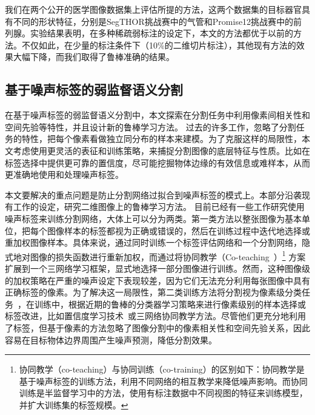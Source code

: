 我们在两个公开的医学图像数据集上评估所提的方法，这两个数据集的目标器官具有不同的形状特征，分别是SegTHOR挑战赛\citep{trullo2019multiorgan}中的气管和Promise12挑战赛\citep{Litjens2014EvaluationOP}中的前列腺。实验结果表明，在多种稀疏弱标注的设定下，本文的方法都优于以前的方法。不仅如此，在少量的标注条件下（10\%的二维切片标注），其他现有方法的效果大幅下降，而我们取得了鲁棒准确的结果。

\subsection{基于噪声标签的弱监督语义分割}
在基于噪声标签的弱监督语义分割中，本文探索在分割任务中利用像素间相关性和空间先验等特性，并且设计新的鲁棒学习方法。
过去的许多工作，忽略了分割任务的特性，把每个像素看做独立同分布的样本来建模。为了克服这样的局限性，本文考虑使用更灵活的表征和训练策略，来捕捉分割图像的底层特征与性质。比如在标签选择中提供更可靠的置信度，尽可能挖掘物体边缘的有效信息或难样本，从而更准确地使用和处理噪声标签。

本文要解决的重点问题是防止分割网络过拟合到噪声标签的模式上。本部分沿袭现有工作的设定，研究二维图像上的鲁棒学习方法。
目前已经有一些工作研究使用噪声标签来训练分割网络，大体上可以分为两类。第一类方法以整张图像为基本单位，把每个图像样本的标签都视为正确或错误的，然后在训练过程中迭代地选择或重加权图像样本\citep{Zhu2019PickandLearnAQ,Xue2020CascadedRL}。具体来说，\citet{Zhu2019PickandLearnAQ}通过同时训练一个标签评估网络和一个分割网络，隐式地对图像的损失函数进行重新加权，而\citet{Xue2020CascadedRL}通过将协同教学（Co-teaching~\cite{Han2018CoteachingRT}）\footnote{协同教学（co-teaching）与协同训练（co-training）的区别如下：协同教学是基于噪声标签的训练方法，利用不同网络的相互教学来降低噪声影响。而协同训练是半监督学习中的方法，使用有标注数据中不同视图的特征来训练模型，并扩大训练集的标签规模。} 方案扩展到一个三网络学习框架，显式地选择一部分图像进行训练。然而，这种图像级的加权策略在严重的噪声设定下表现较差，因为它们无法充分利用每张图像中具有正确标签的像素。为了解决这一局限性，第二类训练方法将分割视为像素级分类任务~\citep{Zhang2020CharacterizingLE,Zhang2020RobustMI}，在训练中，根据近期的鲁棒的分类器学习策略来进行像素级别的样本选择或标签改进，比如置信度学习技术~\citep{Zhang2020CharacterizingLE}或三网络协同教学方法\citep{Zhang2020RobustMI}。尽管他们更充分地利用了标签，但基于像素的方法忽略了图像分割中的像素相关性和空间先验关系，因此容易在目标物体边界周围产生噪声预测，降低分割效果。

